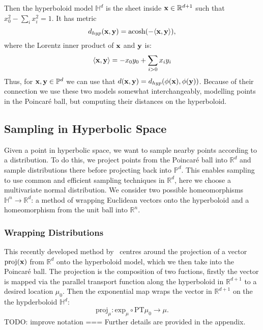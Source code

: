 \documentclass[11pt, twocolumn]{article}
\begin{document}
Then the hyperboloid model $\mathbb{H}^d$ is the sheet inside $\bold{x}\in\mathbb{R}^{d+1}$ such that $x_{0}^{2} - \sum_{i} x_{i}^{2} = 1$.
It has metric
\begin{equation}
    d_{hyp}(\bold{x}, \bold{y}) = \text{acosh}(-\langle \bold{x}, \bold{y} \rangle),
\end{equation}
where the Lorentz inner product of $\bold{x}$ and $\bold{y}$ is:
\begin{equation}
	\langle \bold{x}, \bold{y} \rangle = -x_{0}y_{0} + \sum_{i>0} x_{i}y_{i}
\end{equation}
Thus, for $\bold{x}, \bold{y} \in \mathbb{P}^{d}$ we can use that $d(\bold{x}, \bold{y}) = d_{hyp}(\phi(\bold{x}), \phi(\bold{y}))$.
Because of their connection we use these two models somewhat interchangeably, modelling points in the Poincaré ball, but computing their distances on the hyperboloid.

\subsection{Sampling in Hyperbolic Space}
Given a point in hyperbolic space, we want to sample nearby points according to a distribution.
To do this, we project points from the Poincaré ball into $\mathbb{R}^d$ and sample distributions there before projecting back into $\mathbb{P}^d$.
This enables sampling to use common and efficient sampling techniques in $\mathbb{R}^d$, here we choose a multivariate normal distribution.
We consider two possible homeomorphisms $\mathbb{H}^n \to \mathbb{R}^d$: a method of wrapping Euclidean vectors onto the hyperboloid and a homeomorphism from the unit ball into $\mathbb{R}^n$.

\subsubsection{Wrapping Distributions}
This recently developed method by~\cite{nagano2019wrapped} centres around the projection of a vector $\text{proj}(\bold{x})$ from $\mathbb{R}^d$ onto the hyperboloid model, which we then take into the Poincaré ball.
The projection is the composition of two fuctions, firstly the vector is mapped via the parallel transport function along the hyperboloid in $\mathbb{R}^{d+1}$ to a desired location $\mu_0$.
Then the exponential map wraps the vector in $\mathbb{R}^{d+1}$ on the the hypderboloid $\mathbb{H}^d$:
\begin{equation}
    \text{proj}_{\mu}: \text{exp}_{\mu} \circ \text{PT}{\mu_{0} \to \mu}.
\end{equation}
TODO: improve notation ===
Further details are provided in the appendix.
\end{document}
